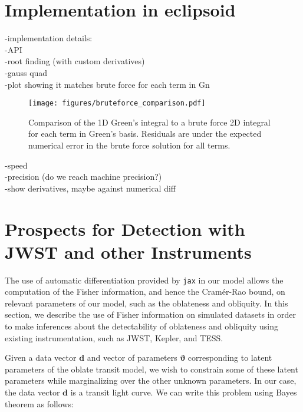 \documentclass[twocolumn]{aastex631}
\begin{document}
\section{Implementation in eclipsoid} \label{sec:eclipsoid}
-implementation details:\\
    -API\\
    -root finding (with custom derivatives)\\
    -gauss quad\\
    -plot showing it matches brute force for each term in Gn   \\
\begin{figure}[ht!]
    \begin{centering}
        \texttt{[image: figures/bruteforce\_comparison.pdf]}
        \caption{Comparison of the 1D Green's integral to a brute force 2D integral for each term in Green's basis. Residuals are under the expected numerical error in the brute force solution for all terms.
        }
        \label{fig:bruteforce_comparison}
    \end{centering}
\end{figure}

-speed\\
-precision (do we reach machine precision?)\\
-show derivatives, maybe against numerical diff\\
\section{Prospects for Detection with JWST and other Instruments} \label{sec:jwstdetect}

The use of automatic differentiation provided by \texttt{jax} in our model allows the computation of the Fisher information, and hence the Cramér-Rao bound, on relevant parameters of our model, such as the oblateness and obliquity. In this section, we describe the use of Fisher information on simulated datasets in order to make inferences about the detectability of oblateness and obliquity using existing instrumentation, such as JWST, Kepler, and TESS.

Given a data vector $\mathbf{d}$ and vector of parameters $\boldsymbol{\boldsymbol{\vartheta}}$ corresponding to latent parameters of the oblate transit model, we wish to constrain some of these latent parameters while marginalizing over the other unknown parameters. In our case, the data vector $\mathbf{d}$ is a transit light curve. We can write this problem using Bayes theorem as follows:
\end{document}
